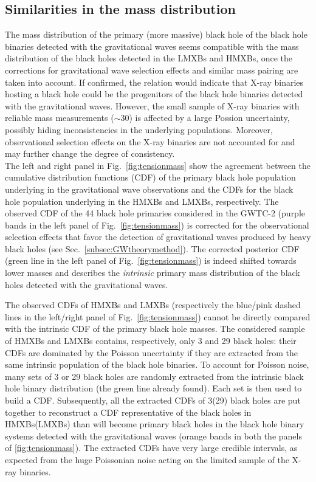 \documentclass[a4paper,titlepage]{book}     	%
\begin{document}
\subsection{Similarities in the mass distribution}
The mass distribution of the primary (more massive) black hole of the black hole binaries detected with the gravitational waves seems compatible with the mass distribution of the black holes detected in the LMXBs and HMXBs, once the corrections for gravitational wave selection effects and similar mass pairing are taken into account. If confirmed, the relation would indicate that X-ray binaries hosting a black hole could be the progenitors of the black hole binaries detected with the gravitational waves. However, the small sample of X-ray binaries with reliable mass measurements ($\sim 30$) is affected by a large Possion uncertainty, possibly hiding inconsistencies in the underlying populations. Moreover, observational selection effects on the X-ray binaries are not accounted for and may further change the degree of consistency. \\

The left and right panel in Fig.\ \ref{fig:tensionmass} show the agreement between the cumulative distribution functions (CDF) of the primary black hole population underlying in the gravitational wave observations and the CDFs for the black hole population underlying in the HMXBs and LMXBs, respectively. The observed CDF of the 44 black hole primaries considered in the GWTC-2 (purple bands in the left panel of Fig.\ \ref{fig:tensionmass}) is corrected for the observational selection effects that favor the detection of gravitational waves produced by heavy black holes (see Sec.\ \ref{subsec:GWtheorymethod}). The corrected posterior CDF (green line in the left panel of Fig.\ \ref{fig:tensionmass}) is indeed shifted towards lower masses and describes the \textit{intrinsic} primary mass distribution of the black holes detected with the gravitational waves. 

The observed CDFs of HMXBs and LMXBs (respectively the blue/pink dashed lines in the left/right panel of Fig.\ \ref{fig:tensionmass}) cannot be directly compared with the intrinsic CDF of the primary black hole masses. The considered sample of HMXBs and LMXBs contains, respectively, only 3 and 29 black holes: their CDFs are dominated by the Poisson uncertainty if they are extracted from the same intrinsic population of the black hole binaries. To account for Poisson noise, many sets of 3 or 29 black holes are randomly extracted from the intrinsic black hole binary distribution (the green line already found). Each set is then used to build a CDF. Subsequently, all the extracted CDFs of 3(29) black holes are put together to reconstruct a CDF representative of the black holes in HMXBs(LMXBs) than will become primary black holes in the black hole binary systems detected with the gravitational waves (orange bands in both the panels of \ref{fig:tensionmass}). The extracted CDFs have very large credible intervals, as expected from the huge Poissonian noise acting on the limited sample of the X-ray binaries. \\
\end{document}
